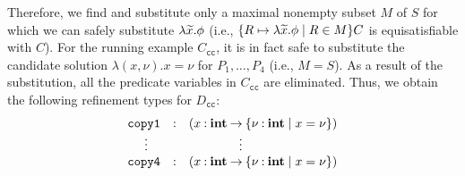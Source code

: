 Therefore, we find and substitute only a maximal nonempty subset \(M\)
of \(S\) for which we can safely substitute \(\lambda\widetilde{x}.\phi\) (i.e.,
\(\{{R \mapsto \lambda\widetilde{x}.\phi \mid R \in M}\}C\) is equisatisfiable
with \(C\)).
%
%
For the running example \(C_{\texttt{cc}}\), it is in fact safe to
substitute the candidate solution \(\lambda (x,\nu). x=\nu\) for
\(P_1,\dots,P_4\) (i.e., \(M=S\)).  As a result of the substitution, all
the predicate variables in \(C_{\texttt{cc}}\) are eliminated.  Thus, we
obtain the following refinement types for \(D_{\texttt{cc}}\):
\[
\begin{array}{rcl}
\texttt{copy1}&\mathbin{:}&(x\mathbin{:}{\mathbf{int}}\mathbin{\rightarrow}{\{{\nu\mathbin{:}\mathbf{int} \mid x=\nu}\}}) \\
\vdots\quad &&\qquad\qquad \vdots \\
\texttt{copy4}&\mathbin{:}&(x\mathbin{:}{\mathbf{int}}\mathbin{\rightarrow}{\{{\nu\mathbin{:}\mathbf{int} \mid x=\nu}\}})
\end{array}
\]



%
